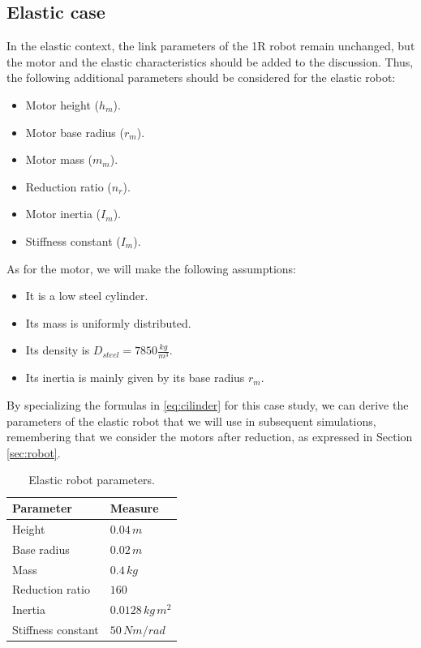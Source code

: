 \documentclass[a4paper]{article}
\begin{document}
\subsection{Elastic case}
In the elastic context, the link parameters of the 1R robot remain unchanged, but the motor and the elastic characteristics should be added to the discussion. Thus, the following additional parameters should be considered for the elastic robot:

\begin{itemize}
    \item Motor height ($h_m$).
    \item Motor base radius ($r_m$).
    \item Motor mass ($m_m$).
    \item Reduction ratio ($n_r$).
    \item Motor inertia ($I_m$).
    \item Stiffness constant ($I_m$).
\end{itemize}

As for the motor, we will make the following assumptions:
\begin{itemize}
    \item It is a low steel cylinder.
    \item Its mass is uniformly distributed.
    \item Its density is $D_{steel}=7850 \frac{kg}{m^3}$.
    \item Its inertia is mainly given by its base radius $r_m$.
\end{itemize} 

By specializing the formulas in \eqref{eq:cilinder} for this case study, we can derive the parameters of the elastic robot that we will use in subsequent simulations, remembering that we consider the motors after reduction, as expressed in Section \ref{sec:robot}.

\begin{table}
\centering
\caption{Elastic robot parameters.}
\begin{tabular}{P{4.5cm}P{2.5cm}} 
\hline\hline
 \textbf{Parameter} & \textbf{Measure} \\ 
\hline
 Height & $0.04\, m$\\ 
\hline
 Base radius & $0.02\, m$\\ 
\hline
 Mass & $0.4\, kg$\\ 
\hline
 Reduction ratio & $160$\\
\hline
 Inertia & $0.0128\, kg\,m^2$\\
\hline
 Stiffness constant & $50\, Nm/rad$\\
\hline\hline
\end{tabular}
\end{table}
\end{document}
